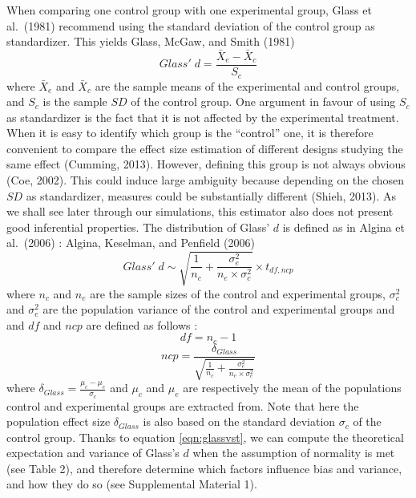 \documentclass[
  english,
  man,floatsintext]{apa6}
\begin{document}
When comparing one control group with one experimental group, Glass et al.~(1981) recommend using the standard deviation of the control group as standardizer. This yields \color{white} Glass, McGaw, and Smith (1981) \color{black}
\begin{equation*} 
Glass' \; d = \frac{\bar{X}_{e} - \bar{X}_{c}}{S_{c}}
\label{eqn:Glassds}
\end{equation*}
where \(\bar{X}_{e}\) and \(\bar{X}_{c}\) are the sample means of the experimental and control groups, and \(S_{c}\) is the sample \(SD\) of the control group. One argument in favour of using \(S_c\) as standardizer is the fact that it is not affected by the experimental treatment. When it is easy to identify which group is the ``control'' one, it is therefore convenient to compare the effect size estimation of different designs studying the same effect (Cumming, 2013). However, defining this group is not always obvious (Coe, 2002). This could induce large ambiguity because depending on the chosen \(SD\) as standardizer, measures could be substantially different (Shieh, 2013). As we shall see later through our simulations, this estimator also does not present good inferential properties. The distribution of Glass' \(d\) is defined as in Algina et al.~(2006) : \color{white} Algina, Keselman, and Penfield (2006) \color{black}
\begin{equation} 
Glass' \; d \sim \sqrt{\frac{1}{n_{c}}+\frac{\sigma_{e}^2}{n_{e} \times \sigma^2_{c}}} \times t_{df,ncp}
\label{eqn:glassvst}
\end{equation}
where \(n_c\) and \(n_e\) are the sample sizes of the control and experimental groups, \(\sigma^2_c\) and \(\sigma^2_e\) are the population variance of the control and experimental groups and and \(df\) and \(ncp\) are defined as follows :
\begin{equation} 
df = n_{c}-1
\label{eqn:glassdf}
\end{equation}
\begin{equation*} 
ncp = \frac{\delta_{Glass}}{\sqrt{\frac{1}{n_{c}} + \frac{\sigma_{e}^2}{n_{e} \times \sigma^2_{c}}}}
\label{eqn:glassncp}
\end{equation*}
where \(\delta_{Glass} = \frac{\mu_{c}-\mu_{e}}{\sigma_{c}}\) and \(\mu_c\) and \(\mu_e\) are respectively the mean of the populations control and experimental groups are extracted from. Note that here the population effect size \(\delta_{Glass}\) is also based on the standard deviation \(\sigma_c\) of the control group. Thanks to equation \ref{eqn:glassvst}, we can compute the theoretical expectation and variance of Glass's \(d\) when the assumption of normality is met (see Table 2), and therefore determine which factors influence bias and variance, and how they do so (see Supplemental Material 1).
\end{document}
